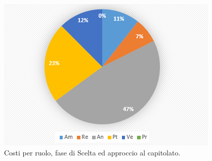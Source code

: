\documentclass[a4paper]{article}
\begin{document}
			\begin{figure}[H]
				\centering
				\includegraphics[scale=0.7]{pc_costi_approccio}
				\caption{Costi per ruolo, fase di Scelta ed approccio al capitolato.}
			\end{figure}
			
\end{document}
